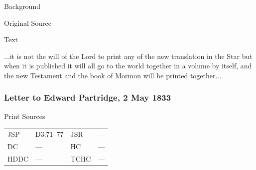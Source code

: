 			\begin{description}
				\item[Background]
			\end{description}
			
			
			\begin{description}
				\item[Original Source]
			\end{description}
			
			
			\begin{description}
				\item[Text]
			\end{description}
			
				 ...it is not the will of the Lord to print any of the new translation in the Star but when it is published it will all go to the world together in a volume by itself, and the new Testament and the book of Mormon will be printed together...
				 
		\subsubsection{Letter to Edward Partridge, 2 May 1833}
			\label{EMS-1833-JS-2-MAY-1833}
		
			\begin{description}
				\item[Print Sources]
			\end{description}

				\begin{tabular}{p{0.5in}p{1in}p{0.5in}p{1in}}
				JSP	 	& D3:71--77		& JSR 		& --- \\
				DC	 	& --- 		& HC 		& --- \\
				HDDC 	& ---		& TCHC 		& --- \\
				\end{tabular}
			
